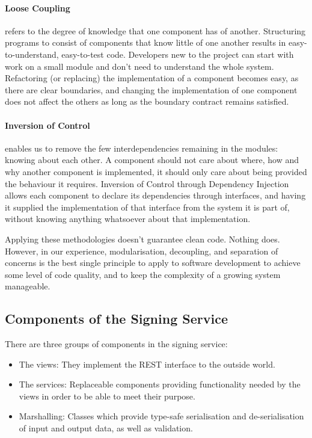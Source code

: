 \paragraph{Loose Coupling} refers to the degree of knowledge that one component has of another.
Structuring programs to consist of components that know little of one another
results in easy-to-understand, easy-to-test code.
Developers new to the project can start with work on a small module and don't need to understand the whole system.
Refactoring (or replacing) the implementation of a component becomes easy,
as there are clear boundaries,
and changing the implementation of one component does not affect the others as long as
the boundary contract remains satisfied.


\paragraph{Inversion of Control} enables us to remove the few interdependencies remaining in the modules:
knowing about each other.
A component should not care about where, how and why another component is implemented,
it should only care about being provided the behaviour it requires.
Inversion of Control through Dependency Injection allows each component to declare
its dependencies through interfaces,
and having it supplied the implementation of that interface from the system it is part of,
without knowing anything whatsoever about that implementation.

Applying these methodologies doesn't guarantee clean code.
Nothing does.
However, in our experience, modularisation, decoupling, and separation of concerns is the best single principle
to apply to software development to achieve some level of code quality,
and to keep the complexity of a growing system manageable.
\pagebreak

\subsection{Components of the Signing Service}\label{subsec:modules-of-the-signing-service}
There are three groups of components in the signing service:
\begin{itemize}
    \item The views: They implement the \gls{REST} interface to the outside world.
    \item The services: Replaceable components providing functionality needed by the views in order to
    be able to meet their purpose.
    \item Marshalling: Classes which provide type-safe serialisation and de-serialisation of input and output data,
    as well as validation.
\end{itemize}

